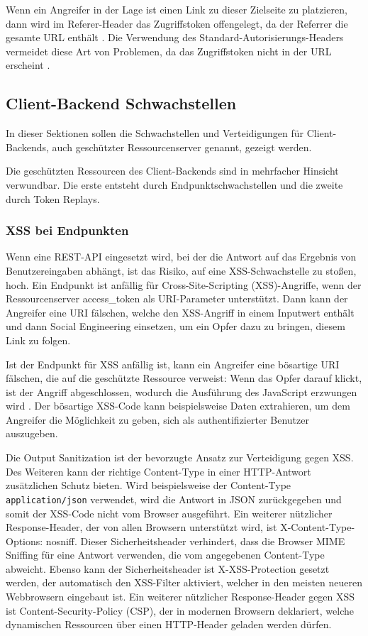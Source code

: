 
Wenn ein Angreifer in der Lage ist einen Link zu dieser Zielseite zu platzieren, dann wird im Referer-Header das Zugriffstoken offengelegt, da der Referrer die gesamte URL enthält  \cite{OAuth2inAction}. Die Verwendung des Standard-Autorisierungs-Headers vermeidet diese Art von Problemen, da das Zugriffstoken nicht in der URL erscheint \cite{OAuth2inAction}.

\subsection{Client-Backend Schwachstellen}

In dieser Sektionen sollen die Schwachstellen und Verteidigungen für Client-Backends, auch geschützter Ressourcenserver genannt, gezeigt werden. 

Die geschützten Ressourcen des Client-Backends sind in mehrfacher Hinsicht verwundbar. Die erste entsteht durch Endpunktschwachstellen und die zweite durch Token Replays.

\subsubsection{XSS bei Endpunkten}

Wenn eine REST-API eingesetzt wird, bei der die Antwort auf das Ergebnis von Benutzereingaben abhängt, ist das Risiko, auf eine XSS-Schwachstelle zu stoßen, hoch. Ein Endpunkt ist anfällig für Cross-Site-Scripting (XSS)-Angriffe, wenn der Ressourcenserver access\_token als URI-Parameter unterstützt. Dann kann der Angreifer eine URI fälschen, welche den XSS-Angriff in einem Inputwert enthält und dann Social Engineering einsetzen, um ein Opfer dazu zu bringen, diesem Link zu folgen. \cite{OAuth2inAction}

Ist der Endpunkt für XSS anfällig ist, kann ein Angreifer eine bösartige URI fälschen, die auf die geschützte Ressource verweist: Wenn das Opfer darauf klickt, ist der Angriff abgeschlossen, wodurch die Ausführung des JavaScript erzwungen wird \cite{OAuth2inAction}. Der bösartige XSS-Code kann beispielsweise Daten extrahieren, um dem Angreifer die Möglichkeit zu geben, sich als authentifizierter Benutzer auszugeben. 

Die Output Sanitization ist der bevorzugte Ansatz zur Verteidigung gegen XSS. Des Weiteren kann der richtige Content-Type in einer HTTP-Antwort zusätzlichen Schutz bieten. Wird beispielsweise der Content-Type \texttt{application/json} verwendet, wird die Antwort in JSON zurückgegeben und somit der XSS-Code nicht vom Browser ausgeführt. Ein weiterer nützlicher Response-Header, der von allen Browsern unterstützt wird, ist X-Content-Type-Options: nosniff. Dieser Sicherheitsheader verhindert, dass die Browser MIME Sniffing für eine Antwort verwenden, die vom angegebenen Content-Type abweicht. Ebenso kann der Sicherheitsheader ist X-XSS-Protection gesetzt werden, der automatisch den XSS-Filter aktiviert, welcher in den meisten neueren Webbrowsern eingebaut ist. Ein weiterer nützlicher Response-Header gegen XSS ist Content-Security-Policy (CSP), der in modernen Browsern deklariert, welche dynamischen Ressourcen über einen HTTP-Header geladen werden dürfen.

